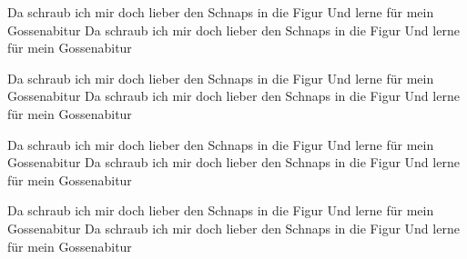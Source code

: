     \beginchorus\replay[chorus]
        Da schraub ich mir doch lieber den Schnaps in die Figur
        Und lerne für mein Gossenabitur
        Da schraub ich mir doch lieber den Schnaps in die Figur
        Und lerne für mein Gossenabitur
    \endchorus

    \beginchorus\replay[chorus]
        Da schraub ich mir doch lieber den Schnaps in die Figur
        Und lerne für mein Gossenabitur
        Da schraub ich mir doch lieber den Schnaps in die Figur
        Und lerne für mein Gossenabitur
    \endchorus

    \beginchorus\replay[chorus]
        Da schraub ich mir doch lieber den Schnaps in die Figur
        Und lerne für mein Gossenabitur
        Da schraub ich mir doch lieber den Schnaps in die Figur
        Und lerne für mein Gossenabitur
    \endchorus

    \beginchorus\replay[chorus]
        Da schraub ich mir doch lieber den Schnaps in die Figur
        Und lerne für mein Gossenabitur
        Da schraub ich mir doch lieber den Schnaps in die Figur
        Und lerne für mein Gossenabitur
    \endverse
\endsong
